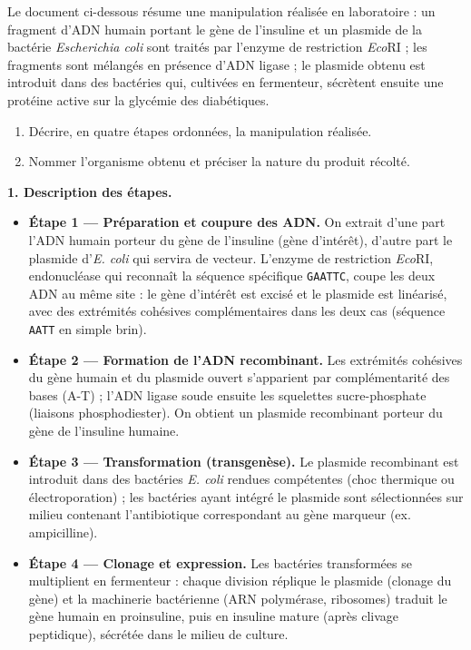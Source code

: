 \documentclass[11pt]{article}
\newcommand{\cle}[1]{{\popxbold\color{popdark}#1}}
\begin{document}
\begin{exoresolu}
Le document ci-dessous résume une manipulation réalisée en laboratoire : un fragment d'ADN humain portant le gène de l'insuline et un plasmide de la bactérie \emph{Escherichia coli} sont traités par l'enzyme de restriction \emph{Eco}RI ; les fragments sont mélangés en présence d'ADN ligase ; le plasmide obtenu est introduit dans des bactéries qui, cultivées en fermenteur, sécrètent ensuite une protéine active sur la glycémie des diabétiques.
\begin{enumerate}
\item Décrire, en quatre étapes ordonnées, la manipulation réalisée.
\item Nommer l'organisme obtenu et préciser la nature du produit récolté.
\end{enumerate}
\tcblower
\textbf{1. Description des étapes.}
\begin{itemize}
\item \textbf{Étape 1 — Préparation et coupure des ADN.} On extrait d'une part l'ADN humain porteur du \cle{gène de l'insuline} (gène d'intérêt), d'autre part le \cle{plasmide} d'\emph{E. coli} qui servira de vecteur. L'enzyme de restriction \emph{Eco}RI, endonucléase qui reconnaît la séquence spécifique \texttt{GAATTC}, coupe les deux ADN au même site : le gène d'intérêt est excisé et le plasmide est linéarisé, avec des \cle{extrémités cohésives} complémentaires dans les deux cas (séquence \texttt{AATT} en simple brin).
\item \textbf{Étape 2 — Formation de l'ADN recombinant.} Les extrémités cohésives du gène humain et du plasmide ouvert s'apparient par complémentarité des bases (A-T) ; l'\cle{ADN ligase} soude ensuite les squelettes sucre-phosphate (liaisons phosphodiester). On obtient un \cle{plasmide recombinant} porteur du gène de l'insuline humaine.
\item \textbf{Étape 3 — Transformation (transgenèse).} Le plasmide recombinant est introduit dans des bactéries \emph{E. coli} rendues compétentes (choc thermique ou électroporation) ; les bactéries ayant intégré le plasmide sont sélectionnées sur milieu contenant l'antibiotique correspondant au gène marqueur (ex. ampicilline).
\item \textbf{Étape 4 — Clonage et expression.} Les bactéries transformées se multiplient en fermenteur : chaque division réplique le plasmide (clonage du gène) et la machinerie bactérienne (ARN polymérase, ribosomes) traduit le gène humain en \cle{proinsuline}, puis en \cle{insuline} mature (après clivage peptidique), sécrétée dans le milieu de culture.

\end{itemize}
\end{exoresolu}
\end{document}
